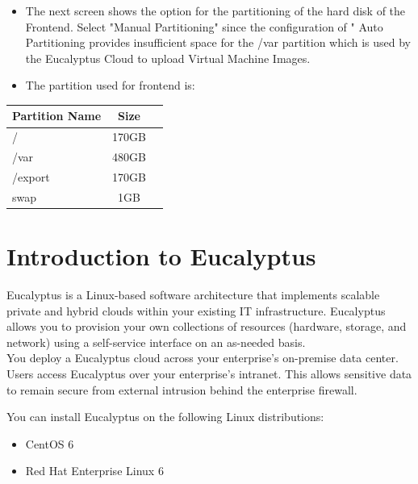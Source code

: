 \begin{itemize}
\item The next screen shows the option for the partitioning of the hard disk of the Frontend. Select "Manual Partitioning" since the configuration of " Auto Partitioning provides insufficient space for the /var partition which is used by the Eucalyptus Cloud to upload Virtual Machine Images.

\item The partition used for frontend is: \\ 
\end{itemize}

\begin{center}
\begin{tabular}{ | l | c | r |}
    \hline
    Partition Name & Size  \\ \hline
    /&170GB \\ 
    /var&480GB \\
	/export&170GB \\
	swap&1GB    \\
    \hline
  \end{tabular}
\end{center}

\chapter{Introduction to Eucalyptus}

Eucalyptus is a Linux-based software architecture that implements scalable private and hybrid clouds within your existing IT infrastructure. Eucalyptus allows you to provision your own collections of resources (hardware, storage, and network) using a self-service interface on an as-needed basis. \linebreak
\\
You deploy a Eucalyptus cloud across your enterprise’s on-premise data center. Users access Eucalyptus over your enterprise's intranet. This allows sensitive data to remain secure from external intrusion behind the enterprise firewall.
\linebreak

You can install Eucalyptus on the following Linux distributions:
\begin{itemize}
\item CentOS 6
\item Red Hat Enterprise Linux 6
\end{itemize}

